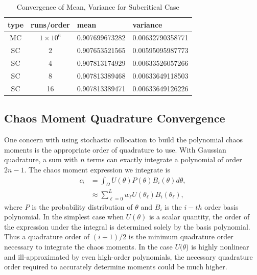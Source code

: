 \begin{table}
\begin{center}
\begin{tabular}{c c|l l}
type & runs/order & mean & variance \\ \hline
MC & $1\times10^6$ & 0.907699673282 & 0.00632790358771 \\
SC & 2 & 0.907653521565 & 0.00595095987773 \\
SC & 4 & 0.907813174929 & 0.00633526057266\\
SC & 8 & 0.907813389468 & 0.00633649118503 \\
SC & 16 & 0.907813389471 & 0.00633649126226
\end{tabular}
\end{center}
\caption{Convergence of Mean, Variance for Subcritical Case}
\label{tab:1dsub}
\end{table}

\subsection{Chaos Moment Quadrature Convergence}
One concern with using stochastic collocation to build the polynomial chaos moments is the appropriate order of quadrature to use.  With Gaussian quadrature, a sum with $n$ terms can exactly integrate a polynomial of order $2n-1$.  The chaos moment expression we integrate is
\begin{align}
c_i &= \int_\Omega U(\theta)P(\theta)B_i(\theta)d\theta,\\
  &\approx \sum_{\ell=0}^L w_\ell U(\theta_\ell)B_i(\theta_\ell),
\end{align}
where $P$ is the probability distribution of $\theta$ and $B_i$ is the $i-th$ order basis polynomial.  In the simplest case when $U(\theta)$ is a scalar quantity, the order of the expression under the integral is determined solely by the basis polynomial.  Thus a quadrature order of $(i+1)/2$ is the minimum quadrature order necessary to integrate the chaos moments.  In the case $U(\theta$) is highly nonlinear and ill-approximated by even high-order polynomials, the necessary quadrature order required to accurately determine moments could be much higher.

